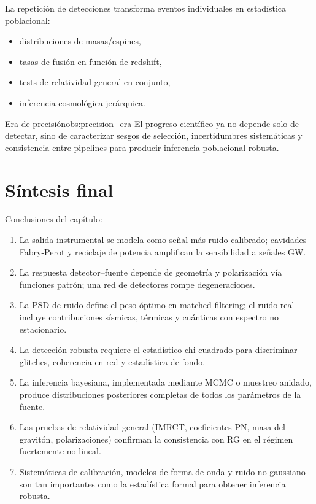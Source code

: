 La repetición de detecciones transforma eventos individuales en estadística poblacional:
\begin{itemize}[leftmargin=2em]
  \item distribuciones de masas/espines,
  \item tasas de fusión en función de redshift,
  \item tests de relatividad general en conjunto,
  \item inferencia cosmológica jerárquica.
\end{itemize}

\begin{observacion}{Era de precisión}{obs:precision_era}
El progreso científico ya no depende solo de detectar, sino de caracterizar sesgos de selección, incertidumbres sistemáticas y consistencia entre pipelines para producir inferencia poblacional robusta.
\end{observacion}

\section{Síntesis final}
\label{sec:sintesis_cap18}

Conclusiones del capítulo:
\begin{enumerate}[leftmargin=2em, label=\textbf{\arabic*.}]
  \item La salida instrumental se modela como señal más ruido calibrado; cavidades Fabry-Perot y reciclaje de potencia amplifican la sensibilidad a señales GW.
  \item La respuesta detector--fuente depende de geometría y polarización vía funciones patrón; una red de detectores rompe degeneraciones.
  \item La PSD de ruido define el peso óptimo en matched filtering; el ruido real incluye contribuciones sísmicas, térmicas y cuánticas con espectro no estacionario.
  \item La detección robusta requiere el estadístico chi-cuadrado para discriminar glitches, coherencia en red y estadística de fondo.
  \item La inferencia bayesiana, implementada mediante MCMC o muestreo anidado, produce distribuciones posteriores completas de todos los parámetros de la fuente.
  \item Las pruebas de relatividad general (IMRCT, coeficientes PN, masa del gravitón, polarizaciones) confirman la consistencia con RG en el régimen fuertemente no lineal.
  \item Sistemáticas de calibración, modelos de forma de onda y ruido no gaussiano son tan importantes como la estadística formal para obtener inferencia robusta.
\end{enumerate}

